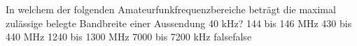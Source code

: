     {In welchem der folgenden Amateurfunkfrequenzbereiche beträgt die maximal zulässige belegte Bandbreite einer Aussendung 40 kHz?}
    {144 bis 146 MHz}
    {430 bis 440 MHz}
    {1240 bis 1300 MHz}
    {7000 bis 7200 kHz}
    {false}{false}